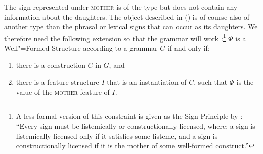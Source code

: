 The sign represented under \textsc{mother} is of the type  but does not contain any
information about the daughters.
The object described in () is of course also of another type than the phrasal or lexical signs that can occur as its daughters.
We therefore need the following extension so that the grammar will work \citep*[]{SWB2003a}:\footnote{%
A less formal version of this constraint is given as the Sign Principle by
\citet[]{Sag2012a}: ``Every sign must be listemically or constructionally licensed, where: a
sign is listemically licensed only if it satisfies some listeme, and a sign is constructionally
licensed if it is the mother of some well-formed construct.''
}
\ea
\label{meta-construction-statemnet}
$\Phi$ is a Well"=Formed Structure according to a grammar $G$ if and only if:
\begin{enumerate}
\item there is a construction $C$ in $G$, and
\item there is a feature structure $I$ that is an instantiation of $C$, such that
      $\Phi$ is the value of the \textsc{mother} feature of $I$.
\end{enumerate}
\z


